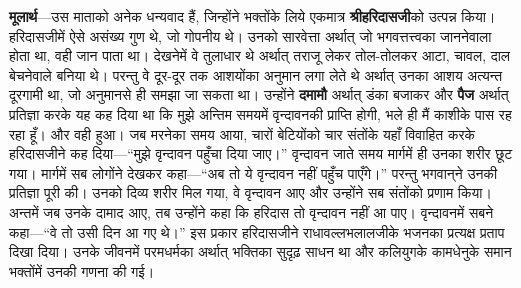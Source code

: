 \begin{sloppypar}\justifying{}
\textbf{मूलार्थ}—उस माताको अनेक धन्यवाद हैं, जिन्होंने भक्तोंके लिये एकमात्र \textbf{श्रीहरिदासजी}को उत्पन्न किया। हरिदासजीमें ऐसे असंख्य गुण थे, जो गोपनीय थे। उनको सारवेत्ता अर्थात् जो भगवत्तत्त्वका जाननेवाला होता था, वही जान पाता था। देखनेमें वे तुलाधार थे अर्थात् तराजू लेकर तोल-तोलकर आटा, चावल, दाल बेचनेवाले बनिया थे। परन्तु वे दूर-दूर तक आशयोंका अनुमान लगा लेते थे अर्थात् उनका आशय अत्यन्त दूरगामी था, जो अनुमानसे ही समझा जा सकता था। उन्होंने \textbf{दमामौ} अर्थात् डंका बजाकर और \textbf{पैज} अर्थात् प्रतिज्ञा करके यह कह दिया था कि मुझे अन्तिम समयमें वृन्दावनकी प्राप्ति होगी, भले ही मैं काशीके पास रह रहा हूँ। और वही हुआ। जब मरनेका समय आया, चारों बेटियोंको चार संतोंके यहाँ विवाहित करके हरिदासजीने कह दिया—“मुझे वृन्दावन पहुँचा दिया जाए।” वृन्दावन जाते समय मार्गमें ही उनका शरीर छूट गया। मार्गमें सब लोगोंने देखकर कहा—“अब तो ये वृन्दावन नहीं पहुँच पाएँगे।” परन्तु भगवान्‌ने उनकी प्रतिज्ञा पूरी की। उनको दिव्य शरीर मिल गया, वे वृन्दावन आए और उन्होंने सब संतोंको प्रणाम किया। अन्तमें जब उनके दामाद आए, तब उन्होंने कहा कि हरिदास तो वृन्दावन नहीं आ पाए। वृन्दावनमें सबने कहा—“वे तो उसी दिन आ गए थे।” इस प्रकार हरिदासजीने राधावल्लभ\-लालजीके भजनका प्रत्यक्ष प्रताप दिखा दिया। उनके जीवनमें परमधर्मका अर्थात् भक्तिका सुदृढ़ साधन था और कलियुगके कामधेनुके समान भक्तोंमें उनकी गणना की गई।
\end{sloppypar}


